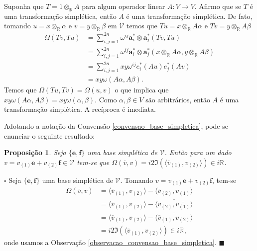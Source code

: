 \documentclass[12pt]{book}
\newtheorem{proposicao}[teorema]{Proposição}
\newenvironment{prova}[1]{$\square$ #1}{\hfill$\blacksquare$}
\newcommand{\complexificado}[1]{\mathcal{#1}}
\newcommand{\complexificacaoelemento}[2]{#1\otimes_{\reta} #2}
\newcommand{\formaSimpletica}[2]{\omega(#1, #2)}
\newcommand{\formaSimpleticaExtendida}[2]{\Omega(#1, #2)}
\newcommand{\parteImaginaria}[1]{\Im(#1)}
\newcommand{\produtointerno}[2]{\langle #1, #2 \rangle}
\newcommand{\real}[1]{\mathbb{R}^{#1}}
\newcommand{\reta}{\real{}}
\begin{document}
	Suponha que $T=\complexificacaoelemento{1}{A}$ para algum operador linear $A:V \to V$. Afirmo que se $T$ é uma transformação simplética, então $A$ é uma transformação simplética. De fato, tomando $u = \complexificacaoelemento{x}{\alpha}$ e $v=\complexificacaoelemento{y}{\beta}$ em $\complexificado{V}$ temos que $Tu = \complexificacaoelemento{x}{A\alpha}$ e $Tv= \complexificacaoelemento{y}{A\beta}$
	$$
	\begin{aligned}
	\Omega(Tv,Tu)
	&= \sum_{i,j = 1}^{2n}
	\omega^{ij}\textbf{a}^{*}_{i}\otimes \textbf{a}^{*}_{j}(Tv,Tu)
	\\
	&= 
	\sum_{i,j = 1}^{2n}
	\omega^{ij}\textbf{a}^{*}_{i}\otimes \textbf{a}^{*}_{j}(\complexificacaoelemento{x}{A\alpha},\complexificacaoelemento{y}{A\beta})
	\\
	&= \sum_{i,j = 1}^{2n}
	xy\omega^{ij}e^{*}_{i}(Au)e^{*}_{j}(Av)
	\\
	&= xy
	\formaSimpletica{A\alpha}{A\beta}.
	\end{aligned}
	$$  
	Temos que $\formaSimpleticaExtendida{Tu}{Tv} = \formaSimpleticaExtendida{u}{v}$ o que implica que $xy
	\formaSimpletica{A\alpha}{A\beta} = xy
	\formaSimpletica{\alpha}{\beta}$. Como $\alpha, \beta \in V$ são arbitrários, então $A$ é uma transformação simplética. A recíproca é imediata.
	
	Adotando a notação da Convensão \ref{convensao_base_simpletica}, pode-se enunciar o seguinte resultado:
	
	\begin{proposicao}\label{proposicao_forma_simpletica_vetor_conjugado}
		Seja $\{\textbf{e}, \textbf{f}\}$ uma base simplética de $\complexificado{V}$. Então para um dado $v = v_{(1)}\textbf{e}+v_{(2)}\textbf{f} \in \complexificado{V}$ tem-se que $\formaSimpleticaExtendida{\overline{v}}{v}
		=i2\parteImaginaria{\produtointerno{\overline{v}_{(1)}}{v_{(2)}}} \in i\reta$.
	\end{proposicao}
	\begin{prova}
		Seja $\{\textbf{e}, \textbf{f} \}$ uma base simplética de $\complexificado{V}$. Tomando $v = v_{(1)}\textbf{e}+v_{(2)}\textbf{f}$, tem-se
		$$
		\begin{aligned}
		\formaSimpleticaExtendida{\overline{v}}{v} 
		&= \produtointerno{\overline{v}_{(1)}}{v_{(2)}}- \produtointerno{\overline{v}_{(2)}}{v_{(1)}}
		\\
		&= \produtointerno{\overline{v}_{(1)}}{v_{(2)}}- \overline{\produtointerno{v_{(2)}}{\overline{v_{(1)}}}}
		\\
		&= \produtointerno{\overline{v}_{(1)}}{v_{(2)}}-\overline{ \produtointerno{\overline{v}_{(1)}}{v_{(2)}}}
		\\
		&=i2\parteImaginaria{\produtointerno{\overline{v}_{(1)}}{v_{(2)}}}\in i\reta,
		\end{aligned}
		$$
		onde usamos a Observação \ref{observacao_convensao_base_simpletica}.
	\end{prova}
	
\end{document}
